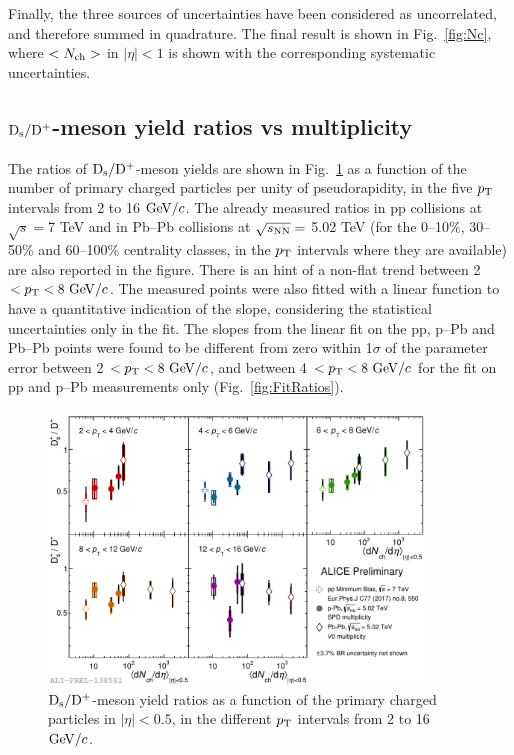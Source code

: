 Finally, the three sources of uncertainties have been considered as uncorrelated, and therefore summed in quadrature. The final result is shown in Fig.~\ref{fig:Nc}, where $<N_{\rm ch}>$ in $|\eta|<1$ is shown with the corresponding systematic uncertainties.


\subsection{${\rm D_s}/{\rm D^+}$-meson yield ratios vs multiplicity }
The ratios of ${\rm D_s}/{\rm D^+}$-meson yields are shown in Fig.~\ref{fig:DsDplusRatios} as a function of
the number of primary charged particles per unity of pseudorapidity, in the five $p_{\rm T}$ intervals from 2 to 16 $\mathrm{GeV}/c$.
The already measured ratios in pp collisions at $\sqrt{s}=$7 TeV and in Pb--Pb collisions at $\sqrt{s_{\rm NN}}=$ 5.02 TeV
(for the 0--10\%, 30--50\% and 60--100\% centrality classes, in the $p_{\rm T}$ intervals where they are available) are also reported in the figure.
There is an hint of a non-flat trend between 2 $< p_{\rm T} < 8~\mathrm{GeV}/c$. The measured points were also
fitted with a linear function to have a quantitative indication of the slope, considering the statistical 
uncertainties only in the fit. The slopes from the linear fit on the pp, p--Pb and Pb--Pb points were found to be different from zero within 1$\sigma$ of the parameter error between 2 $< p_{\rm T} < 8 ~\mathrm{GeV}/c$, and between 4 $< p_{\rm T} < 8 ~\mathrm{GeV}/c$ for the
fit on pp and p--Pb measurements only (Fig.~\ref{fig:FitRatios}).

\begin{figure}[h!]
    \begin{center}
          \includegraphics[width=0.9\textwidth]{./FigCap6/DsOverDplusVsMult_pp_pPb_PbPb.pdf}
    \end{center}
    \caption{ ${\rm D_s}/{\rm D^+}$-meson yield ratios as a function of the primary charged particles in $|\eta|<0.5$, in the different $p_{\rm T}$ intervals from 2 to 16 $\mathrm{GeV}/c$.}
    \label{fig:DsDplusRatios}
\end{figure}

